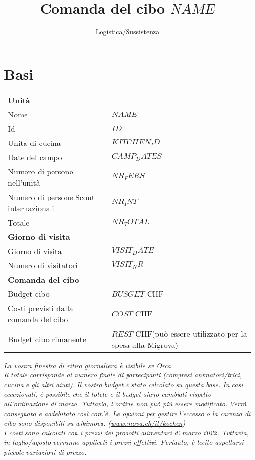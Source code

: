\documentclass[11pt]{article}
\author{Logistica/Sussistenza}
\title{Comanda del cibo $NAME$}
\begin{document}
	\section*{Basi}

		\begin{tabular}{ll}
            \textbf{Unit\`a}\\
            Nome & $NAME$ \\
            Id & $ID$\\
            Unità di cucina & $KITCHEN_ID$\\
            Date del campo & $CAMP_DATES$ \\
            Numero di persone nell'unit\`a & $NR_PERS$\\
            Numero di persone Scout internazionali & $NR_INT$\\
            Totale & $NR_TOTAL$\\
            \textbf{Giorno di visita}\\
            Giorno di visita & $VISIT_DATE$\\
            Numero di visitatori & $VISIT_NR$\\
            \textbf{Comanda del cibo}\\
            Budget cibo & $BUSGET$ CHF\\
            Costi previsti dalla comanda del cibo & $COST$ CHF\\
            Budget cibo rimanente & $REST$ CHF\hspace{1cm}(pu\`o essere utilizzato per la spesa alla Migrova)  \\
        \end{tabular}

\vspace{1cm}
\textit{La vostra finestra di ritiro giornaliera \`e visibile su Orca.}\\

\textit{Il totale corrisponde al numero finale di partecipanti (compresi animatori/trici, cucina e gli altri aiuti). Il vostro budget \`e stato calcolato su questa base. In casi eccezionali, \`e possibile che il totale e il budget siano cambiati rispetto all'ordinazione di marzo. Tuttavia, l'ordine non pu\`o pi\`u essere modificato. Verrà consegnato e addebitato così com'\`e. Le opzioni per gestire l'eccesso o la carenza di cibo sono disponibili su wikimova.  (\href{https://www.mova.ch/it/kochen}{www.mova.ch/it/kochen})}\\

\textit{I costi sono calcolati con i prezzi dei prodotti alimentari di marzo 2022. Tuttavia, in luglio/agosto verranno applicati i prezzi effettivi. Pertanto, \`e lecito aspettarsi piccole variazioni di prezzo.}
\color{black}

\newpage
\small
\end{document}
